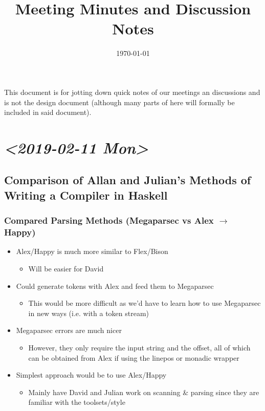 \documentclass[11pt]{article}
\date{\today}
\title{Meeting Minutes and Discussion Notes}
\begin{document}
\maketitle
\tableofcontents

This document is for jotting down quick notes of our meetings an
discussions and is not the design document (although many parts of
here will formally be included in said document).
\section{\textit{<2019-02-11 Mon>}}
\label{sec:orgb85eef1}
\subsection{Comparison of Allan and Julian's Methods of Writing a Compiler in Haskell}
\label{sec:orgf2049b8}
\subsubsection{Compared Parsing Methods (Megaparsec vs Alex \(\to\) Happy)}
\label{sec:orgda91efb}
\begin{itemize}
\item Alex/Happy is much more similar to Flex/Bison
\begin{itemize}
\item Will be easier for David
\end{itemize}
\item Could generate tokens with Alex and feed them to Megaparsec
\begin{itemize}
\item This would be more difficult as we'd have to learn how to use
Megaparsec in new ways (i.e. with a token stream)
\end{itemize}
\item Megaparsec errors are much nicer
\begin{itemize}
\item However, they only require the input string and the offset, all of
which can be obtained from Alex if using the linepos or monadic wrapper
\end{itemize}
\item Simplest approach would be to use Alex/Happy
\begin{itemize}
\item Mainly have David and Julian work on scanning \& parsing since they
are familiar with the toolsets/style
\end{itemize}
\end{itemize}
\end{document}
